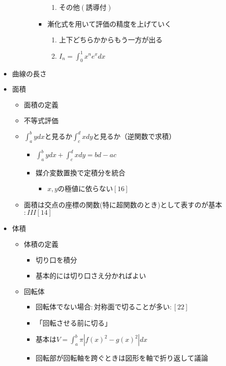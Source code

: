 \documentclass[dvipdfmx,uplatex]{jsarticle}
\begin{document}
\begin{itemize}
\begin{itemize}
\begin{itemize}
\begin{itemize}
\begin{enumerate}
					\item $ その他(誘導付)$
				\end{enumerate}
				\item $ 漸化式を用いて評価の精度を上げていく$
				\begin{enumerate}
					\item $ 上下どちらかからもう一方が出る$
					\item $I_n = \int^1_0 x^n e^xdx$
				\end{enumerate}
			\end{itemize}
		\end{itemize}
	\end{itemize}
	\item $ 曲線の長さ$
	\item $ 面積$
	\begin{itemize}
		\item $ 面積の定義$
		\item $ 不等式評価$
		\item $ \int^b_a ydx と見るか \int^d_c xdy と見るか（逆関数で求積）$
		\begin{itemize}
			\item $ \int^b_a ydx + \int^d_c xdy = bd - ac$
			\item $ 媒介変数置換で定積分を統合$
			\begin{itemize}
				\item $ x,yの極値に依らない [16]$
			\end{itemize}
		\end{itemize}
		\item 面積は交点の座標の関数(特に超関数のとき)として表すのが基本$:III[14]$
	\end{itemize}
	\item $ 体積$
	\begin{itemize}
		\item $ 体積の定義$
		\begin{itemize}
			\item $ 切り口を積分$
			\item $ 基本的には切り口さえ分かればよい$
		\end{itemize}
		\item $ 回転体$
		\begin{itemize}
			\item $ 回転体でない場合:対称面で切ることが多い:[22]$
			\item $ 「回転させる前に切る」$
			\item $ 基本はV = \int^b_a \pi |f(x)^2 - g(x)^2|dx$
			\item $ 回転部が回転軸を跨ぐときは図形を軸で折り返して議論$

\end{itemize}
\end{itemize}
\end{itemize}
\end{document}
